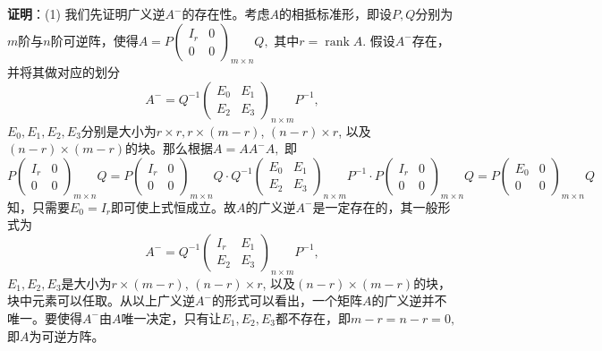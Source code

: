 \ifIncludeAnswer

\newpageorvspace

\textbf{证明}：(1) 我们先证明广义逆$A^-$的存在性。考虑$A$的相抵标准形，即设$P,Q$分别为$m$阶与$n$阶可逆阵，使得$A = P \begin{pmatrix} I_r & 0 \\ 0 & 0 \end{pmatrix}_{m\times n}\!\!\!\!\!\!\!\!\!\!\! Q,$ 其中$r = \operatorname{rank} A.$ 假设$A^-$存在，并将其做对应的划分
$$A^- = Q^{-1} \begin{pmatrix} E_0 & E_1 \\ E_2 & E_3 \end{pmatrix}_{n\times m}\!\!\!\!\!\!\!\!\!\!\! P^{-1},$$
$E_0, E_1, E_2, E_3$分别是大小为$r\times r, r \times (m-r)$, $(n-r) \times r$, 以及$(n-r) \times (m-r)$的块。那么根据$A = AA^-A,$ 即
$$P \begin{pmatrix} I_r & 0 \\ 0 & 0 \end{pmatrix}_{m\times n}\!\!\!\!\!\!\!\!\!\!\! Q = P \begin{pmatrix} I_r & 0 \\ 0 & 0 \end{pmatrix}_{m\times n}\!\!\!\!\!\!\!\!\!\!\! Q \cdot Q^{-1} \begin{pmatrix} E_0 & E_1 \\ E_2 & E_3 \end{pmatrix}_{n\times m}\!\!\!\!\!\!\!\!\!\!\! P^{-1} \cdot P \begin{pmatrix} I_r & 0 \\ 0 & 0 \end{pmatrix}_{m\times n}\!\!\!\!\!\!\!\!\!\!\! Q = P \begin{pmatrix} E_0 & 0 \\ 0 & 0 \end{pmatrix}_{m\times n}\!\!\!\!\!\!\!\!\!\!\! Q$$
知，只需要$E_0 = I_r$即可使上式恒成立。故$A$的广义逆$A^-$是一定存在的，其一般形式为
$$A^- = Q^{-1} \begin{pmatrix} I_r & E_1 \\ E_2 & E_3 \end{pmatrix}_{n\times m}\!\!\!\!\!\!\!\!\!\!\! P^{-1},$$
$E_1, E_2, E_3$是大小为$r \times (m-r)$, $(n-r) \times r$, 以及$(n-r) \times (m-r)$的块，块中元素可以任取。从以上广义逆$A^-$的形式可以看出，一个矩阵$A$的广义逆并不唯一。要使得$A^-$由$A$唯一决定，只有让$E_1, E_2, E_3$都不存在，即$m - r = n - r = 0,$ 即$A$为可逆方阵。

\vspace{0.5em}

